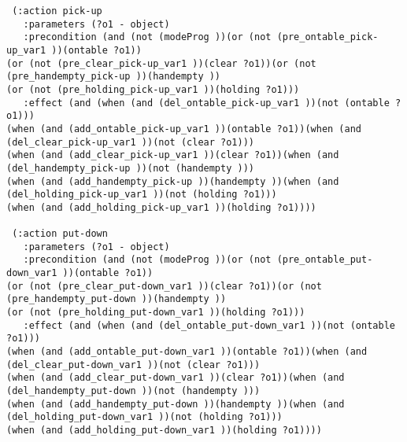 \begin{scriptsize}
\begin{verbatim}
 (:action pick-up
   :parameters (?o1 - object)
   :precondition (and (not (modeProg ))(or (not (pre_ontable_pick-up_var1 ))(ontable ?o1))
(or (not (pre_clear_pick-up_var1 ))(clear ?o1))(or (not (pre_handempty_pick-up ))(handempty ))
(or (not (pre_holding_pick-up_var1 ))(holding ?o1)))
   :effect (and (when (and (del_ontable_pick-up_var1 ))(not (ontable ?o1)))
(when (and (add_ontable_pick-up_var1 ))(ontable ?o1))(when (and (del_clear_pick-up_var1 ))(not (clear ?o1)))
(when (and (add_clear_pick-up_var1 ))(clear ?o1))(when (and (del_handempty_pick-up ))(not (handempty )))
(when (and (add_handempty_pick-up ))(handempty ))(when (and (del_holding_pick-up_var1 ))(not (holding ?o1)))
(when (and (add_holding_pick-up_var1 ))(holding ?o1))))

 (:action put-down
   :parameters (?o1 - object)
   :precondition (and (not (modeProg ))(or (not (pre_ontable_put-down_var1 ))(ontable ?o1))
(or (not (pre_clear_put-down_var1 ))(clear ?o1))(or (not (pre_handempty_put-down ))(handempty ))
(or (not (pre_holding_put-down_var1 ))(holding ?o1)))
   :effect (and (when (and (del_ontable_put-down_var1 ))(not (ontable ?o1)))
(when (and (add_ontable_put-down_var1 ))(ontable ?o1))(when (and (del_clear_put-down_var1 ))(not (clear ?o1)))
(when (and (add_clear_put-down_var1 ))(clear ?o1))(when (and (del_handempty_put-down ))(not (handempty )))
(when (and (add_handempty_put-down ))(handempty ))(when (and (del_holding_put-down_var1 ))(not (holding ?o1)))
(when (and (add_holding_put-down_var1 ))(holding ?o1))))


\end{verbatim}
\end{scriptsize}
